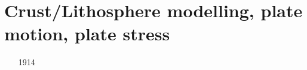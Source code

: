 \section{Crust/Lithosphere modelling, plate motion, plate stress}

\begin{scriptsize}
\begin{itemize}
\item[1914]
\textcite{barr14} \\
\item[\nineteenseventy]
\textcite{walc70} \\
\item[\nineteenseventyseven] 
\textcite{crou77} \\
\item[\nineteeneightyone]
\textcite{brpo81} \\
\item[\nineteeneightytwo]
\textcite{flfr82} \\
\item[\nineteeneightythree]
\textcite{mcja83} \\
\textcite{flfr83} \\
\item[\nineteeneightyfour]
\textcite{kupa84} \\
\textcite{riff84} \\
\item[\nineteeneightysix]
\textcite{stbb86} \\
\item[\nineteeneightyeight] 
\textcite{daco88} \\
\textcite{coda88} \\
\item[\nineteeneightynine]
\textcite{jabe89} \\
\item[\nineteenninety]
\textcite{chmo90} \\
\item[\nineteenninetyone]
\textcite{chbv91} \\
\textcite{daco91} \\

\end{itemize}
\end{scriptsize}
